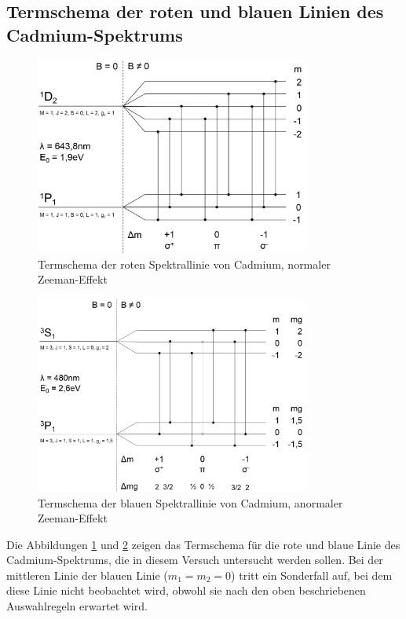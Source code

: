 \subsection{Termschema der roten und blauen Linien des Cadmium-Spektrums}
\begin{figure}
	\centering
	\includegraphics[width=0.8\textwidth]{img/rot}
	\caption{Termschema der roten Spektrallinie von Cadmium, normaler Zeeman-Effekt}
	\label{fig:rot}
\end{figure}
\begin{figure}
	\centering
	\includegraphics[width=0.8\textwidth]{img/blau}
	\caption{Termschema der blauen Spektrallinie von Cadmium, anormaler Zeeman-Effekt}
	\label{fig:blau}
\end{figure}

Die Abbildungen \ref{fig:rot} und \ref{fig:blau} zeigen das Termschema für die rote und blaue Linie des Cadmium-Spektrums, die in diesem Versuch untersucht werden sollen.
Bei der mittleren Linie der blauen Linie ($m_1 = m_2 = 0$) tritt ein Sonderfall auf, bei dem diese Linie nicht beobachtet wird, obwohl sie nach den oben beschriebenen Auswahlregeln erwartet wird.